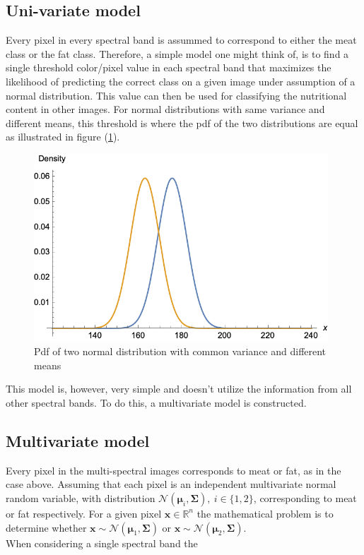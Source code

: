 \documentclass{article}
\begin{document}
\subsection{Uni-variate model}\label{sec:3_univariate_model}
Every pixel in every spectral band is assummed to correspond to either the meat class or the fat class. Therefore, a simple model one might think of, is to find a single threshold color/pixel value in each spectral band that maximizes the likelihood of predicting the correct class on a given image under assumption of a normal distribution. This value can then be used for classifying the nutritional content in other images. For normal distributions with same variance and different means, this threshold is where the pdf of the two distributions are equal as illustrated in figure (\ref{bell}).
\begin{figure}[H]
    \centering
    \includegraphics[width = 11cm]{bellCurves.png}
    \caption{Pdf of two normal distribution with common variance and different means}
    \label{bell}
\end{figure}
This model is, however, very simple and doesn't utilize the information from all other spectral bands. To do this, a multivariate model is constructed.

\subsection{Multivariate model}\label{sec:3_multivariate_model}
Every pixel in the multi-spectral images corresponds to meat or fat, as in the case above. Assuming that each pixel is an independent multivariate normal random variable, with distribution $\mathcal{N}(\boldsymbol{\mu}_i,\boldsymbol{\Sigma}),\:i\in\{1,2\}$, corresponding to meat or fat respectively. For a given pixel $\textbf{x}\in\mathbb{R}^n$ the mathematical problem is to determine whether $\textbf{x}\sim\mathcal{N}(\boldsymbol{\mu}_1,\boldsymbol{\Sigma})$ or $\textbf{x}\sim\mathcal{N}(\boldsymbol{\mu}_2,\boldsymbol{\Sigma})$.\\
When considering a single spectral band the 
\end{document}
